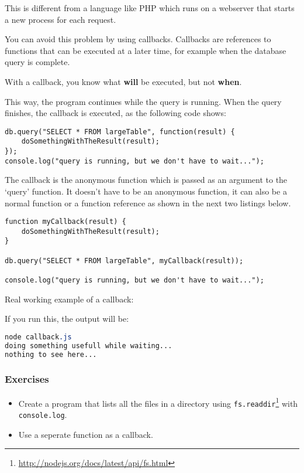 \documentclass[a4paper]{report}
\begin{document}
This is different from a language like PHP which runs on a webserver that starts a new process for each request.

You can avoid this problem by using callbacks. Callbacks are references to functions that can be executed at a later time, for example when the database query is complete. 

With a callback, you know what \textbf{will} be executed, but not \textbf{when}.

This way, the program continues while the query is running. When the query finishes, the callback is executed, as the following code shows:

\begin{lstlisting}
db.query("SELECT * FROM largeTable", function(result) {
	doSomethingWithTheResult(result);
});
console.log("query is running, but we don't have to wait...");
\end{lstlisting}

\noindent The callback is the anonymous function which is passed as an argument to the `query' function. It doesn't have to be an anonymous function, it can also be a normal function or a function reference as shown in the next two listings below.

\begin{lstlisting}
function myCallback(result) {
	doSomethingWithTheResult(result);
}

db.query("SELECT * FROM largeTable", myCallback(result));

console.log("query is running, but we don't have to wait...");
\end{lstlisting}

\noindent Real working example of a callback:

If you run this, the output will be:
\begin{lstlisting}[language=css]
node callback.js 
doing something usefull while waiting...
nothing to see here...
\end{lstlisting}

\subsubsection*{Exercises}
\begin{itemize}
	\item Create a program that lists all the files in a directory using \texttt{fs.readdir}\footnote{\url{http://nodejs.org/docs/latest/api/fs.html}} with \texttt{console.log}.
	\item Use a seperate function as a callback.
\end{itemize}
\end{document}
